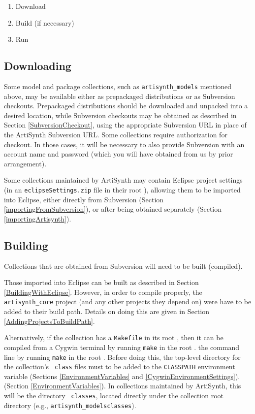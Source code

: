 \begin{enumerate}

\item Download

\item Build (if necessary)

\item Run

\end{enumerate}

\subsection{Downloading}

Some model and package collections, such as {\tt artisynth\_models}
mentioned above, may be available either as prepackaged distributions
or as Subversion checkouts. Prepackaged distributions should be
downloaded and unpacked into a desired location, while Subversion
checkouts may be obtained as described in Section
\ref{SubversionCheckout}, using the appropriate Subversion URL in
place of the ArtiSynth Subversion URL. Some collections require
authorization for checkout. In those cases, it will be necessary to
also provide Subversion with an account name and password (which you
will have obtained from us by prior arrangement).

Some collections maintained by ArtiSynth may contain Eclipse project
settings (in an {\tt eclipseSettings.zip} file in their root
\directory), allowing them to be imported into Eclipse, either
directly from Subversion (Section \ref{importingFromSubversion}), or
after being obtained separately (Section \ref{importingArtisynth}).

\subsection{Building}

Collections that are obtained from Subversion will need to be built
(compiled).

Those imported into Eclipse can be built as described in Section
\ref{BuildingWithEclipse}. However, in order to compile properly, the
{\tt artisynth\_core} project (and any other projects they depend on)
were have to be added to their build path. Details on doing this are
given in Section \ref{AddingProjectsToBuildPath}.

Alternatively, if the collection has a {\tt Makefile} in its root
\directory, then it can be compiled from
\ifWindows
a Cygwin terminal by running {\tt make} in the root \directory. 
\else
the command line by running {\tt make} in the root \directory.
\fi
Before doing this, the top-level directory for the collection's {\tt
class} files must to be added to the {\tt CLASSPATH} environment
variable
\ifWindows
(Sections \ref{EnvironmentVariables} and \ref{CygwinEnvironmentSettings}).
\else
(Section \ref{EnvironmentVariables}).
\fi
In collections maintained by ArtiSynth, this will be the directory {\tt
classes}, located directly under the collection root directory (e.g.,
{\tt artisynth\_models\SEP classes}).

